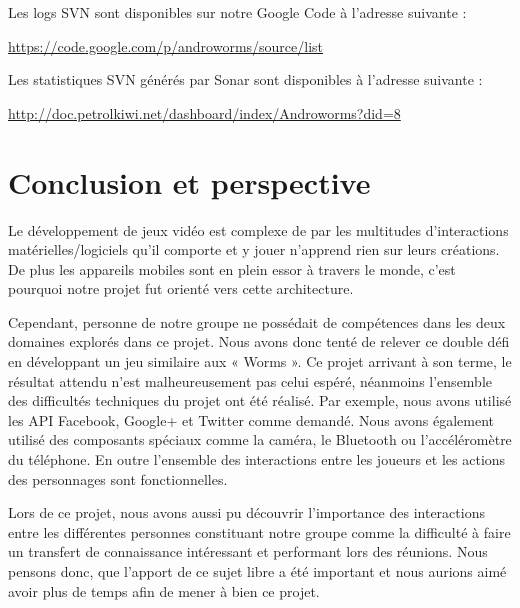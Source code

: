 \documentclass{report}
\begin{document}
Les logs SVN sont disponibles sur notre Google Code à l’adresse suivante :

\url{https://code.google.com/p/androworms/source/list}

\bigskip

Les statistiques SVN générés par Sonar sont disponibles à l’adresse suivante :

\url{http://doc.petrolkiwi.net/dashboard/index/Androworms?did=8}


\newpage

\section{Conclusion et perspective}
\bigskip


Le développement de jeux vidéo est complexe de par les multitudes
d'interactions matérielles/logiciels qu’il comporte et y jouer n’apprend
rien sur leurs créations. De plus les appareils mobiles sont en plein
essor à travers le monde, c’est pourquoi notre projet fut orienté vers
cette architecture.

Cependant, personne de notre groupe ne possédait de compétences dans
les deux domaines explorés dans ce projet. Nous avons donc tenté de
relever ce double défi en développant un jeu similaire aux « Worms ».
Ce projet arrivant à son terme, le résultat attendu n’est
malheureusement pas celui espéré, néanmoins l’ensemble des difficultés
techniques du projet ont été réalisé. Par exemple, nous avons utilisé
les API Facebook, Google+ et Twitter comme demandé. Nous avons également
utilisé des composants spéciaux comme la caméra, le Bluetooth ou
l’accéléromètre du téléphone. En outre l’ensemble des interactions entre
les joueurs et les actions des personnages sont fonctionnelles. 

Lors de ce projet, nous avons aussi pu découvrir l’importance des
interactions entre les différentes personnes constituant notre groupe
comme la difficulté à faire un transfert de connaissance intéressant et
performant lors des réunions. Nous pensons donc, que l’apport de ce sujet
libre a été important et nous aurions aimé avoir plus de temps afin de
mener à bien ce projet.
\end{document}
